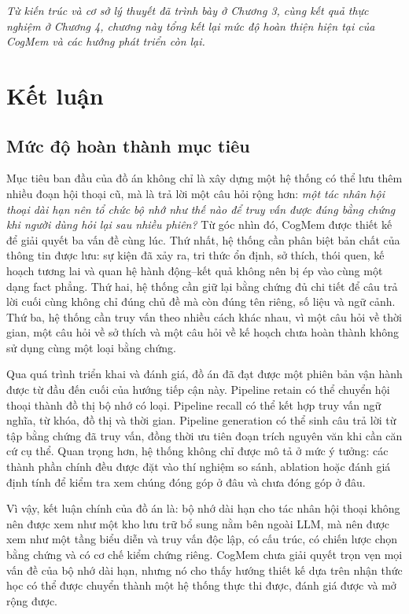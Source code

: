 \documentclass[../main.tex]{subfiles}
\begin{document}
\textit{Từ kiến trúc và cơ sở lý thuyết đã trình bày ở Chương 3, cùng kết quả thực nghiệm ở Chương 4, chương này tổng kết lại mức độ hoàn thiện hiện tại của CogMem và các hướng phát triển còn lại.}

\section{Kết luận}

\subsection{Mức độ hoàn thành mục tiêu}

Mục tiêu ban đầu của đồ án không chỉ là xây dựng một hệ thống có thể lưu thêm nhiều đoạn hội thoại cũ, mà là trả lời một câu hỏi rộng hơn: \textit{một tác nhân hội thoại dài hạn nên tổ chức bộ nhớ như thế nào để truy vấn được đúng bằng chứng khi người dùng hỏi lại sau nhiều phiên?} Từ góc nhìn đó, CogMem được thiết kế để giải quyết ba vấn đề cùng lúc. Thứ nhất, hệ thống cần phân biệt bản chất của thông tin được lưu: sự kiện đã xảy ra, tri thức ổn định, sở thích, thói quen, kế hoạch tương lai và quan hệ hành động--kết quả không nên bị ép vào cùng một dạng fact phẳng. Thứ hai, hệ thống cần giữ lại bằng chứng đủ chi tiết để câu trả lời cuối cùng không chỉ đúng chủ đề mà còn đúng tên riêng, số liệu và ngữ cảnh. Thứ ba, hệ thống cần truy vấn theo nhiều cách khác nhau, vì một câu hỏi về thời gian, một câu hỏi về sở thích và một câu hỏi về kế hoạch chưa hoàn thành không sử dụng cùng một loại bằng chứng.

Qua quá trình triển khai và đánh giá, đồ án đã đạt được một phiên bản vận hành được từ đầu đến cuối của hướng tiếp cận này. Pipeline retain có thể chuyển hội thoại thành đồ thị bộ nhớ có loại. Pipeline recall có thể kết hợp truy vấn ngữ nghĩa, từ khóa, đồ thị và thời gian. Pipeline generation có thể sinh câu trả lời từ tập bằng chứng đã truy vấn, đồng thời ưu tiên đoạn trích nguyên văn khi cần căn cứ cụ thể. Quan trọng hơn, hệ thống không chỉ được mô tả ở mức ý tưởng: các thành phần chính đều được đặt vào thí nghiệm so sánh, ablation hoặc đánh giá định tính để kiểm tra xem chúng đóng góp ở đâu và chưa đóng góp ở đâu.

Vì vậy, kết luận chính của đồ án là: bộ nhớ dài hạn cho tác nhân hội thoại không nên được xem như một kho lưu trữ bổ sung nằm bên ngoài LLM, mà nên được xem như một tầng biểu diễn và truy vấn độc lập, có cấu trúc, có chiến lược chọn bằng chứng và có cơ chế kiểm chứng riêng. CogMem chưa giải quyết trọn vẹn mọi vấn đề của bộ nhớ dài hạn, nhưng nó cho thấy hướng thiết kế dựa trên nhận thức học có thể được chuyển thành một hệ thống thực thi được, đánh giá được và mở rộng được.
\end{document}
